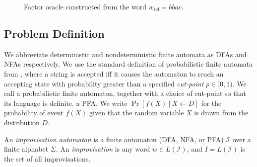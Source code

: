 \documentclass[a4paper,USenglish,numberwithinsect]{lipics}
\theoremstyle{plain}
\theoremstyle{definition}
\newcommand{\suchthat}{\:|\:}
\newcommand{\improvs}{I}
\newcommand{\wref}{w_{\text{ref}}}
\begin{document}
 {
\setlength{\intextsep}{8pt}
\setlength{\belowcaptionskip}{-5pt}
\setlength{\abovecaptionskip}{0pt}
\begin{figure}[tb]
\centering
{}
\caption{Factor oracle constructed from the word $\wref = bbac$.}
\label{figure:factor-oracle}
\end{figure}
}
 
\subsection{Problem Definition}

We abbreviate deterministic and nondeterministic finite
automata as DFAs and NFAs respectively. 
We use the standard definition of probabilistic finite automata from
\cite{rabin-pfas}, where a string is accepted iff it causes the
automaton to reach an accepting state with probability greater than a
specified \emph{cut-point} $p \in [0, 1)$. 
We call a probabilistic finite automaton, together with a choice of
cut-point so that its language is definite, a PFA. 
We write $\Pr[ f(X) \suchthat X \leftarrow D ]$ for the probability of event
$f(X)$ given that the random variable $X$ is drawn from the
distribution $D$. 

\begin{definition}
An \emph{improvisation automaton} is a finite automaton (DFA, NFA, or
PFA) $\mathcal{\improvs}$ over a finite alphabet $\Sigma$. An
\emph{improvisation} is any word $w \in L(\mathcal{\improvs})$, and
$\improvs = L(\mathcal{\improvs})$ is the set of all improvisations. 
\label{defn:improv-auto}
\end{definition}
\end{document}
